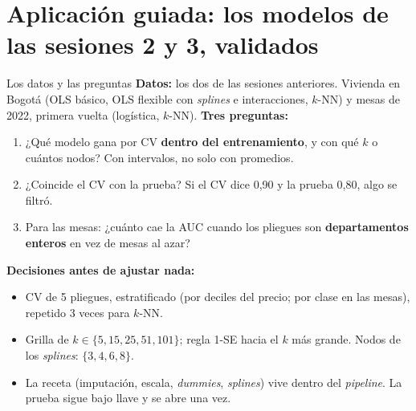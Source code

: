 \documentclass{beamer}
\newcommand{\1}{\mathbb{I}}
\begin{document}
\section{Aplicación guiada: los modelos de las sesiones 2 y 3, validados}
\begin{frame}[noframenumbering]
\tableofcontents[currentsection]
\end{frame}

\begin{frame}{Los datos y las preguntas}
\small
\textbf{Datos:} los dos de las sesiones anteriores. Vivienda en Bogotá (OLS básico, OLS flexible con \emph{splines} e interacciones, $k$-NN) y mesas de 2022, primera vuelta (logística, $k$-NN).
\pause
\vspace{0.1cm}
\textbf{Tres preguntas:}
\begin{enumerate}\itemsep3pt
  \item ¿Qué modelo gana por CV \textbf{dentro del entrenamiento}, y con qué $k$ o cuántos nodos? Con intervalos, no solo con promedios.
  \item ¿Coincide el CV con la prueba? Si el CV dice 0,90 y la prueba 0,80, algo se filtró.
  \item Para las mesas: ¿cuánto cae la AUC cuando los pliegues son \textbf{departamentos enteros} en vez de mesas al azar?
\end{enumerate}
\pause
\vspace{0.1cm}
\textbf{Decisiones antes de ajustar nada:}
\begin{itemize}\itemsep2pt
  \item CV de 5 pliegues, estratificado (por deciles del precio; por clase en las mesas), repetido 3 veces para $k$-NN.
  \item Grilla de $k \in \{5, 15, 25, 51, 101\}$; regla 1-SE hacia el $k$ más grande. Nodos de los \emph{splines}: $\{3, 4, 6, 8\}$.
  \item La receta (imputación, escala, \emph{dummies}, \emph{splines}) vive dentro del \emph{pipeline}. La prueba sigue bajo llave y se abre una vez.
\end{itemize}
\end{frame}
\end{document}
